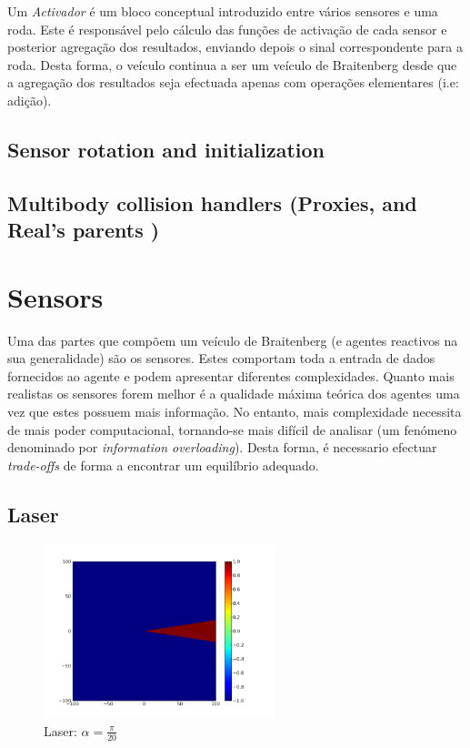 \documentclass[a4paper]{article}
\begin{document}
Um \emph{Activador} é um bloco conceptual introduzido entre vários sensores e uma roda.
Este é responsável pelo cálculo das funções de activação de cada sensor e posterior agregação dos resultados, enviando depois o sinal correspondente para a roda. Desta forma, o veículo continua a ser um veículo de Braitenberg desde que a agregação dos resultados seja efectuada apenas com operações elementares (i.e: adição). 


\subsection{Sensor rotation and initialization}
\indent \indent 

\subsection{Multibody collision handlers (Proxies, and Real's parents )}
\indent \indent

\cleardoublepage
\section{Sensors}
\indent \indent Uma das partes que compõem um veículo de Braitenberg (e agentes reactivos na sua generalidade) são os sensores.
Estes comportam toda a entrada de dados fornecidos ao agente e podem apresentar diferentes complexidades.
Quanto mais realistas os sensores forem melhor é a qualidade máxima teórica dos agentes uma vez que estes possuem mais informação.
No entanto, mais complexidade necessita de mais poder computacional, tornando-se mais difícil de analisar (um fenómeno denominado por \emph{information overloading}).
Desta forma, é necessario efectuar \emph{trade-offs} de forma a encontrar um equilíbrio adequado.

\cleardoublepage
\subsection{Laser}

\begin{figure}[h]
	\vspace{-20pt}
	\begin{center}
		\includegraphics[width=0.6\textwidth]{graphs/sensors/laser.png}
	\end{center}
	\vspace{-20pt}
	\caption{Laser: $\alpha=\frac{\pi}{20}$}
\end{figure}
\end{document}
